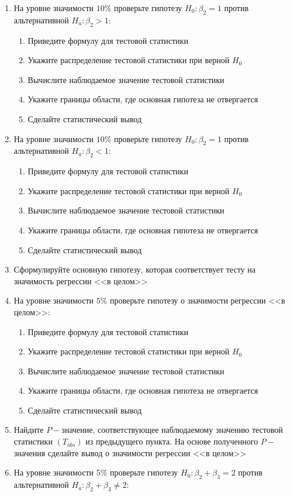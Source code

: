 \begin{problem}
\begin{enumerate}
\item На уровне значимости $10\%$ проверьте гипотезу $H_0: \beta_2 = 1$ против альтернативной $H_a: \beta_2 > 1$:
\begin{enumerate}
\item Приведите формулу для тестовой статистики 
\item Укажите распределение тестовой статистики при верной $H_0$
\item Вычислите наблюдаемое значение тестовой статистики
\item Укажите границы области, где основная гипотеза не отвергается
\item Сделайте статистический вывод
\end{enumerate}
\item На уровне значимости $10\%$ проверьте гипотезу $H_0: \beta_2 = 1$ против альтернативной $H_a: \beta_2 < 1$:
\begin{enumerate}
\item Приведите формулу для тестовой статистики 
\item Укажите распределение тестовой статистики при верной $H_0$
\item Вычислите наблюдаемое значение тестовой статистики
\item Укажите границы области, где основная гипотеза не отвергается
\item Сделайте статистический вывод
\end{enumerate}
\item Сформулируйте основную гипотезу, которая соответствует тесту на значимость регрессии <<в целом>>
\item На уровне значимости $5\%$ проверьте гипотезу о значимости регрессии <<в целом>>:
\begin{enumerate}
\item Приведите формулу для тестовой статистики 
\item Укажите распределение тестовой статистики при верной $H_0$
\item Вычислите наблюдаемое значение тестовой статистики
\item Укажите границы области, где основная гипотеза не отвергается
\item Сделайте статистический вывод
\end{enumerate}
\item Найдите $P-$значение, соответствующее наблюдаемому значению тестовой статистики $(T_{obs})$ из предыдущего пункта. На основе полученного $P-$значения сделайте вывод о значимости регрессии <<в целом>>
\item На уровне значимости $5\%$ проверьте гипотезу  $H_0: \beta_2 + \beta_3 = 2$ против альтернативной $H_a: \beta_2 + \beta_3 \not= 2$:

\end{enumerate}
\end{problem}
